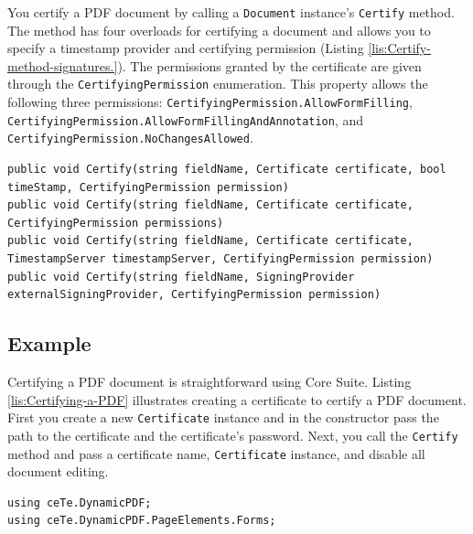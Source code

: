 \documentclass[american,letterpaper]{tufte-book}
\numberwithin{equation}{section}
\numberwithin{figure}{section}
\begin{document}
{You certify a PDF document by calling a \texttt{Document} instance's
\texttt{Certify} method. The method has four overloads for certifying
a document and allows you to specify a timestamp provider  and certifying permission (Listing \ref{lis:Certify-method-signatures.}).
The permissions granted by the certificate are given through the \texttt{CertifyingPermission}
enumeration. This property allows the following three permissions:
\texttt{CertifyingPermission.AllowFormFilling}, \texttt{CertifyingPermission.AllowFormFillingAndAnnotation},
and \texttt{CertifyingPermission.NoChangesAllowed}.

\bgroup{}
\begin{lstlisting}[caption={Certify method signatures.},label={lis:Certify-method-signatures.},basicstyle={\small\ttfamily},breaklines=true]
public void Certify(string fieldName, Certificate certificate, bool timeStamp, CertifyingPermission permission)
public void Certify(string fieldName, Certificate certificate, CertifyingPermission permissions)
public void Certify(string fieldName, Certificate certificate, TimestampServer timestampServer, CertifyingPermission permission)
public void Certify(string fieldName, SigningProvider externalSigningProvider, CertifyingPermission permission)
\end{lstlisting}
\leavevmode\egroup


\subsection{Example}

Certifying a PDF document is straightforward using Core Suite. Listing
\ref{lis:Certifying-a-PDF} illustrates creating a certificate to
certify a PDF document. First you create a new \texttt{Certificate}
instance and in the constructor pass the path to the certificate and
the certificate's password. Next, you call the \texttt{Certify} method
and pass a certificate name, \texttt{Certificate} instance, and disable
all document editing.\bgroup{}
\begin{lstlisting}[caption={Certifying a PDF Document.},label={lis:Certifying-a-PDF},basicstyle={\small\ttfamily},breaklines=true]
using ceTe.DynamicPDF;
using ceTe.DynamicPDF.PageElements.Forms;


\end{lstlisting}}
\end{document}
